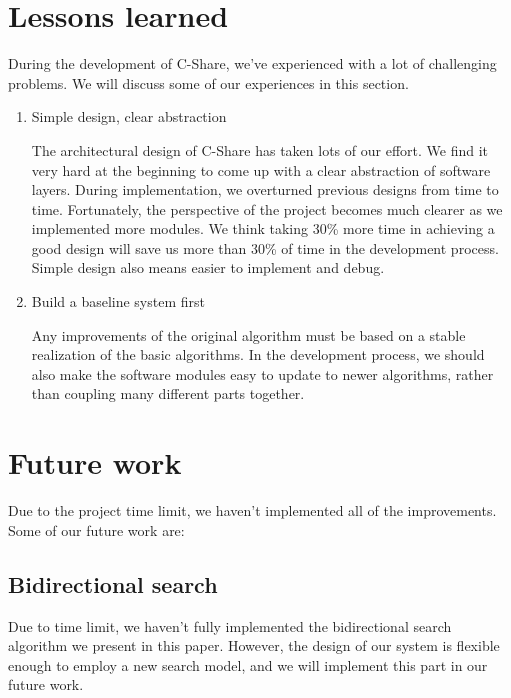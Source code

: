 \documentclass[letterpaper,twocolumn,10pt]{article}
\begin{document}
\section{Lessons learned}
During the development of C-Share, we've experienced with a lot of challenging problems. We will discuss some of our experiences in this section.

\begin{enumerate}
	\item Simple design, clear abstraction

The architectural design of C-Share has taken lots of our effort. We find it very hard at the beginning to come up with a clear abstraction of software layers. During implementation, we overturned previous designs from time to time. Fortunately, the perspective of the project becomes much clearer as we implemented more modules. We think taking 30\% more time in achieving a good design will save us more than 30\% of time in the development process. Simple design also means easier to implement and debug.

\item Build a baseline system first

Any improvements of the original algorithm must be based on a stable realization of the basic algorithms. In the development process, we should also make the software modules easy to update to newer algorithms, rather than coupling many different parts together.

\end{enumerate}



\section{Future work}
Due to the project time limit, we haven't implemented all of the improvements. Some of our future work are:

\subsection{Bidirectional search}
Due to time limit, we haven't fully implemented the bidirectional search algorithm we present in this paper. However, the design of our system is flexible enough to employ a new search model, and we will implement this part in our future work.
\end{document}
